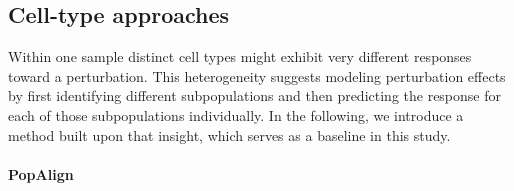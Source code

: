 \subsection{Cell-type approaches}  %
Within one sample distinct cell types might exhibit very different responses toward a perturbation. This heterogeneity suggests modeling perturbation effects by first identifying different subpopulations and then predicting the response for each of those subpopulations individually. In the following, we introduce a method built upon that insight, which serves as a baseline in this study.

\paragraph{PopAlign}

